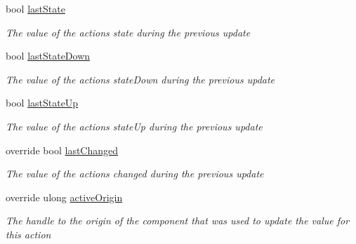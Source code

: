 \begin{DoxyCompactItemize}
bool \mbox{\hyperlink{class_valve_1_1_v_r_1_1_steam_v_r___action___boolean___source_ab00750875aeedfa74cd7ce19ecae2bac}{last\+State}}
\begin{DoxyCompactList}\small\item\em The value of the action\textquotesingle{}s \textquotesingle{}state\textquotesingle{} during the previous update \end{DoxyCompactList}\item 
bool \mbox{\hyperlink{class_valve_1_1_v_r_1_1_steam_v_r___action___boolean___source_ae8ca6561a610cd2484229b1a8ff99911}{last\+State\+Down}}
\begin{DoxyCompactList}\small\item\em The value of the action\textquotesingle{}s \textquotesingle{}state\+Down\textquotesingle{} during the previous update \end{DoxyCompactList}\item 
bool \mbox{\hyperlink{class_valve_1_1_v_r_1_1_steam_v_r___action___boolean___source_aabdbb44ebb825ceb88524a655f4bbdd9}{last\+State\+Up}}
\begin{DoxyCompactList}\small\item\em The value of the action\textquotesingle{}s \textquotesingle{}state\+Up\textquotesingle{} during the previous update \end{DoxyCompactList}\item 
override bool \mbox{\hyperlink{class_valve_1_1_v_r_1_1_steam_v_r___action___boolean___source_a0d4b059215ef754084e98c6b342cfdfd}{last\+Changed}}
\begin{DoxyCompactList}\small\item\em The value of the action\textquotesingle{}s \textquotesingle{}changed\textquotesingle{} during the previous update \end{DoxyCompactList}\item 
override ulong \mbox{\hyperlink{class_valve_1_1_v_r_1_1_steam_v_r___action___boolean___source_a182735fc4bd6d69000885ea290c95124}{active\+Origin}}
\begin{DoxyCompactList}\small\item\em The handle to the origin of the component that was used to update the value for this action \end{DoxyCompactList}\item 

\end{DoxyCompactItemize}
